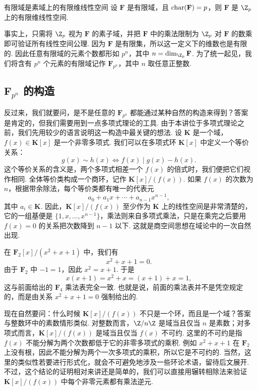 \begin{theorem}{}{有限域是素域上的有限维线性空间}
    设 $\mathbf{F}$ 是有限域，且 $\operatorname{char}(\mathbf{F}) = p$，则 $\mathbf{F}$ 是 $\Z_p$ 上的有限维线性空间.
\end{theorem}

事实上，只需将 $\Z_p$ 视为 $\mathbf{F}$ 的素子域，并把 $\mathbf{F}$ 中的乘法限制为 $\Z_p$ 对 $\mathbf{F}$ 的数乘即可验证所有线性空间公理. 因为 $\mathbf{F}$ 是有限集，所以这一定义下的维数也是有限的. 因此任意有限域的元素个数都形如 $p^n$，其中 $n = \dim_{\Z_p}\mathbf{F}$. 为了统一起见，我们将含有 $p^n$ 个元素的有限域记作 $\mathbf{F}_{p^n}$，其中 $n$ 取任意正整数.

\subsection{$\mathbf{F}_{p^n}$ 的构造}

反过来，我们就要问，是不是任意的 $\mathbf{F}_{p^n}$ 都能通过某种自然的构造来得到？答案是肯定的，但我们需要用到一点多项式理论的工具. 由于本讲位于多项式理论之前，我们先用较少的语言说明这一构造中最关键的想法. 设 $\mathbf{K}$ 是一个域，$f(x)\in\mathbf{K}[x]$ 是一个非零多项式. 我们可以在多项式环 $\mathbf{K}[x]$ 中定义一个等价关系：
\[
    g(x) \sim h(x) \iff f(x) \mid g(x) - h(x).
\]
这个等价关系的含义是，两个多项式相差一个 $f(x)$ 的倍式时，我们便把它们视作相同. 全体等价类构成一个商环，记作 $\mathbf{K}[x]/(f(x))$. 如果 $f(x)$ 的次数为 $n$，根据带余除法，每个等价类都有唯一的代表元
\[
    a_0 + a_1x + \cdots + a_{n - 1}x^{n - 1},
\]
其中 $a_i\in\mathbf{K}$. 因此，$\mathbf{K}[x]/(f(x))$ 至少作为 $\mathbf{K}$ 上的线性空间是非常清楚的，它的一组基便是 $\{1, x, \ldots, x^{n - 1}\}$，乘法则来自多项式乘法，只是在乘完之后要用 $f(x)=0$ 的关系把次数降到 $n-1$ 以下. 这就是商空间思想在域论中的一次自然出现.

\begin{example}{}{}
    在 $\mathbf{F}_2[x]/(x^2+x+1)$ 中，我们有
    \[
        x^2+x+1=0.
    \]
    由于 $\mathbf{F}_2$ 中 $-1=1$，因此 $x^2=x+1$. 于是
    \[
        x(x+1)=x^2+x=(x+1)+x=1,
    \]
    这与前面给出的 $\mathbf{F}_4$ 乘法表完全一致. 也就是说，前面的乘法表并不是凭空规定的，而是由关系 $x^2+x+1=0$ 强制给出的.
\end{example}

现在自然要问：什么时候 $\mathbf{K}[x]/(f(x))$ 不只是一个环，而且是一个域？答案与整数环中的素数情形类似. 对整数而言，$\Z/n\Z$ 是域当且仅当 $n$ 是素数；对多项式而言，$\mathbf{K}[x]/(f(x))$ 是域当且仅当 $f(x)$ 不可约. 这里的不可约是指 $f(x)$ 不能分解为两个次数都低于它的非零多项式的乘积. 例如 $x^2+x+1$ 在 $\mathbf{F}_2$ 上没有根，因此不能分解为两个一次多项式的乘积，所以它是不可约的. 当然，这里的类似性若要进行形式化，就会不可避免地涉及一些环论术语，留待后文展开. 不过，这个结论的证明相对来讲还是简单的，我们可以直接用辗转相除法来验证 $\mathbf{K}[x]/(f(x))$ 中每个非零元素都有乘法逆元.

